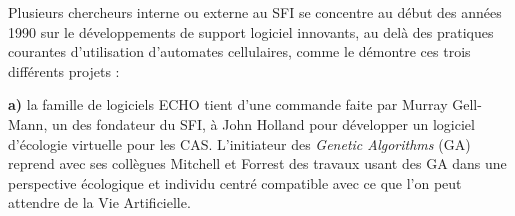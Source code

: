 %









Plusieurs chercheurs interne ou externe au SFI se concentre au début des années 1990 sur le développements de support logiciel innovants, au delà des pratiques courantes d'utilisation d'automates cellulaires, comme le démontre ces trois différents projets :

\textbf{a)} la famille de logiciels ECHO tient d'une commande faite par Murray Gell-Mann, un des fondateur du SFI, à John Holland pour développer un logiciel d'écologie virtuelle pour les CAS. L'initiateur des \textit{Genetic Algorithms} (GA) reprend avec ses collègues Mitchell et Forrest des travaux usant des GA dans une perspective écologique et individu centré compatible avec ce que l'on peut attendre de la Vie Artificielle. \autocites{Holland1993, Mitchell1993, Smith2000}

